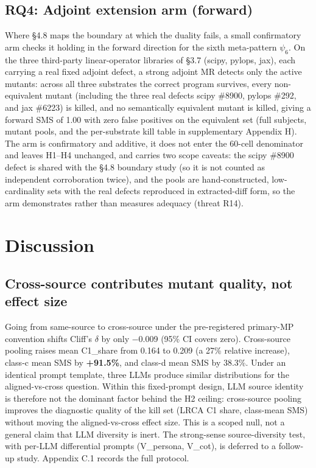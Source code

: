 \documentclass[acmsmall,screen,review]{acmart}
\begin{document}
\subsection{RQ4: Adjoint extension arm (forward)}\label{rq4-adjoint-extension-arm}

Where §4.8 maps the boundary at which the duality fails, a small
confirmatory arm checks it holding in the forward direction for the sixth
meta-pattern $\psi_6$. On the three third-party linear-operator libraries
of §3.7 (scipy, pylops, jax), each carrying a real fixed adjoint defect, a
strong adjoint MR detects only the active mutants: across all three
substrates the correct program survives, every non-equivalent mutant
(including the three real defects scipy \#8900, pylops \#292, and jax
\#6223) is killed, and no semantically equivalent mutant is killed, giving
a forward SMS of 1.00 with zero false positives on the equivalent set
(full subjects, mutant pools, and the per-substrate kill table in
supplementary Appendix H). The arm is confirmatory and additive, it
does not enter the 60-cell denominator and leaves H1--H4 unchanged, and
carries two scope caveats: the scipy \#8900 defect is shared with the §4.8
boundary study (so it is not counted as independent corroboration twice),
and the pools are hand-constructed, low-cardinality sets with the real
defects reproduced in extracted-diff form, so the arm demonstrates rather
than measures adequacy (threat R14).


\section{Discussion}\label{discussion}

\subsection{Cross-source contributes mutant quality, not effect size}\label{cross-source-contributes-mutant-quality-not-effect-size}

Going from same-source to cross-source under the pre-registered
primary-MP convention shifts Cliff's $\delta$ by only −0.009 (95\% CI covers
zero). Cross-source pooling raises mean C1\_share from 0.164 to 0.209 (a
27\% relative increase), class-c mean SMS by \textbf{+91.5\%}, and
class-d mean SMS by 38.3\%. Under an identical prompt template, three
LLMs produce similar distributions for the aligned-vs-cross question.
Within this fixed-prompt design, LLM source identity is therefore not the
dominant factor behind the H2 ceiling: cross-source pooling improves the
diagnostic quality of the kill set (LRCA C1 share, class-mean SMS)
without moving the aligned-vs-cross effect size. This is a scoped null,
not a general claim that LLM diversity is inert. The strong-sense
source-diversity test, with per-LLM differential prompts (V\_persona,
V\_cot), is deferred to a follow-up study. Appendix C.1 records the full
protocol.
\end{document}
